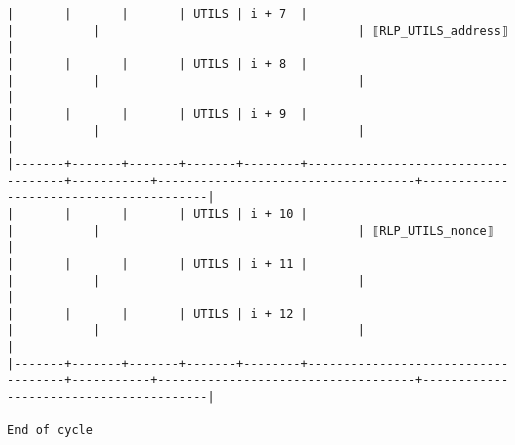 \documentclass[varwidth=\maxdimen,margin=0.5cm,multi={verbatim}]{standalone}
\begin{document}
\begin{verbatim}
|       |       |       | UTILS | i + 7  |                                    |           |                                    | ⟦RLP_UTILS_address⟧                    |
|       |       |       | UTILS | i + 8  |                                    |           |                                    |                                        |
|       |       |       | UTILS | i + 9  |                                    |           |                                    |                                        |
|-------+-------+-------+-------+--------+------------------------------------+-----------+------------------------------------+----------------------------------------|
|       |       |       | UTILS | i + 10 |                                    |           |                                    | ⟦RLP_UTILS_nonce⟧                      |
|       |       |       | UTILS | i + 11 |                                    |           |                                    |                                        |
|       |       |       | UTILS | i + 12 |                                    |           |                                    |                                        |
|-------+-------+-------+-------+--------+------------------------------------+-----------+------------------------------------+----------------------------------------|

End of cycle

\end{verbatim}
\end{document}
